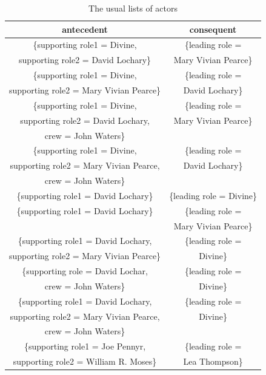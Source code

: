 \documentclass[conference]{IEEEtran}
\begin{document}
\begin{table}[!hbp]
	\caption{The usual lists of actors}
	\begin{center}
	
	\begin{tabular}{|c||c|}
		\hline
		antecedent & consequent \\
		\hline
		\{supporting role1 = Divine, & \{leading role = \\
		 supporting role2 = David Lochary\}  &  Mary Vivian Pearce\}  \\
		 \hline
		 \{supporting role1 = Divine, & \{leading role = \\
		 supporting role2 = Mary Vivian Pearce\}  &  David Lochary\}  \\
		 \hline
		 \{supporting role1 = Divine, & \{leading role = \\
		 supporting role2 = David Lochary,  &  Mary Vivian Pearce\}  \\
		 crew = John Waters\} &   \\
		  \hline
		  \{supporting role1 = Divine, & \{leading role = \\
		  supporting role2 = Mary Vivian Pearce,  &  David Lochary\}  \\
		  crew = John Waters\} &   \\
		\hline
		\{supporting role1 = David Lochary\} & \{leading role = Divine\}\\
		\hline
		\{supporting role1 = David Lochary\} & \{leading role = \\
		 &  Mary Vivian Pearce\}  \\
		 \hline
		 \{supporting role1 = David Lochary, & \{leading role = \\
		 supporting role2 = Mary Vivian Pearce\}  &  Divine\}  \\
		 \hline
		 \{supporting role = David Lochar, & \{leading role = \\
		 crew = John Waters\}  &  Divine\}  \\
		 \hline
		 \{supporting role1 = David Lochary, & \{leading role = \\
		 supporting role2 = Mary Vivian Pearce,  &  Divine\}  \\
		 crew = John Waters\} &   \\
		 \hline
		  \{supporting role1 = Joe Pennyr, & \{leading role = \\
		  supporting role2 = William R. Moses\}  &  Lea Thompson\}  \\
		  \hline
		  
	\end{tabular}
	\end{center}
\end{table}
\end{document}
